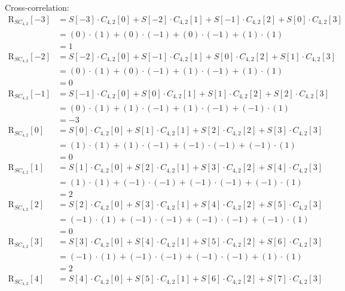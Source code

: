 \begin{solution}
\begin{tasks}
{			Cross-correlation:
			\begin{equation*}
			\begin{split}
			\mathrm{R}_{SC_{4,2}}[-3] &= S[-3] \cdot C_{4,2}[0] + S[-2] \cdot C_{4,2}[1] + S[-1] \cdot C_{4,2}[2] + S[0] \cdot C_{4,2}[3] \\
			&= (0) \cdot (1) + (0) \cdot (-1) + (0) \cdot (-1) + (1) \cdot (1) \\
			&= 1 \\
			\mathrm{R}_{SC_{4,2}}[-2] &= S[-2] \cdot C_{4,2}[0] + S[-1] \cdot C_{4,2}[1] + S[0] \cdot C_{4,2}[2] + S[1] \cdot C_{4,2}[3] \\
			&= (0) \cdot (1) + (0) \cdot (-1) + (1) \cdot (-1) + (1) \cdot (1) \\
			&= 0 \\
			\mathrm{R}_{SC_{4,2}}[-1] &= S[-1] \cdot C_{4,2}[0] + S[0] \cdot C_{4,2}[1] + S[1] \cdot C_{4,2}[2] + S[2] \cdot C_{4,2}[3] \\
			&= (0) \cdot (1) + (1) \cdot (-1) + (1) \cdot (-1) + (-1) \cdot (1) \\
			&= -3 \\
			\mathrm{R}_{SC_{4,2}}[0] &= S[0] \cdot C_{4,2}[0] + S[1] \cdot C_{4,2}[1] + S[2] \cdot C_{4,2}[2] + S[3] \cdot C_{4,2}[3] \\
			&= (1) \cdot (1) + (1) \cdot (-1) + (-1) \cdot (-1) + (-1) \cdot (1) \\
			&= 0 \\
			\mathrm{R}_{SC_{4,2}}[1] &= S[1] \cdot C_{4,2}[0] + S[2] \cdot C_{4,2}[1] + S[3] \cdot C_{4,2}[2] + S[4] \cdot C_{4,2}[3] \\
			&= (1) \cdot (1) + (-1) \cdot (-1) + (-1) \cdot (-1) + (-1) \cdot (1) \\
			&= 2 \\
			\mathrm{R}_{SC_{4,2}}[2] &= S[2] \cdot C_{4,2}[0] + S[3] \cdot C_{4,2}[1] + S[4] \cdot C_{4,2}[2] + S[5] \cdot C_{4,2}[3] \\
			&= (-1) \cdot (1) + (-1) \cdot (-1) + (-1) \cdot (-1) + (-1) \cdot (1) \\
			&= 0 \\
			\mathrm{R}_{SC_{4,2}}[3] &= S[3] \cdot C_{4,2}[0] + S[4] \cdot C_{4,2}[1] + S[5] \cdot C_{4,2}[2] + S[6] \cdot C_{4,2}[3] \\
			&= (-1) \cdot (1) + (-1) \cdot (-1) + (-1) \cdot (-1) + (1) \cdot (1) \\
			&= 2 \\
			\mathrm{R}_{SC_{4,2}}[4] &= S[4] \cdot C_{4,2}[0] + S[5] \cdot C_{4,2}[1] + S[6] \cdot C_{4,2}[2] + S[7] \cdot C_{4,2}[3] \\

\end{split}
\end{equation*}}
\end{tasks}
\end{solution}

